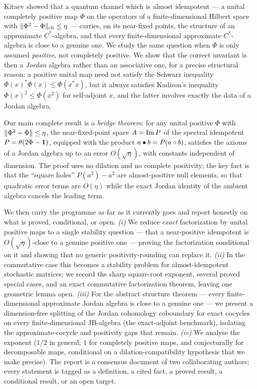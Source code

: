 Kitaev showed that a quantum channel which is almost idempotent --- a unital
completely positive map $\Phi$ on the operators of a finite-dimensional Hilbert
space with $\lVert \Phi^2-\Phi \rVert_{\mathrm{cb}}\le\eta$ --- carries, on its
near-fixed points, the structure of an approximate $C^*$-algebra, and that every
finite-dimensional approximate $C^*$-algebra is close to a genuine one. We study
the same question when $\Phi$ is only assumed \emph{positive}, not completely
positive. We show that the correct invariant is then a \emph{Jordan} algebra
rather than an associative one, for a precise structural reason: a positive
unital map need not satisfy the Schwarz inequality $\Phi(x)^*\Phi(x)\le
\Phi(x^*x)$, but it always satisfies Kadison's inequality $\Phi(x)^2\le\Phi(x^2)$
for self-adjoint $x$, and the latter involves exactly the data of a Jordan
algebra.

Our main complete result is a \emph{bridge theorem}: for any unital positive
$\Phi$ with $\lVert \Phi^2-\Phi \rVert\le\eta$, the near-fixed-point space
$A=\operatorname{Im} P$ of the spectral idempotent $P=\theta(2\Phi-\mathbf{1})$, equipped with the
product $a\bullet b=P(a\circ b)$, satisfies the axioms of a Jordan algebra up to
an error $O(\sqrt\eta)$, with constants independent of dimension. The proof uses
no dilation and no complete positivity; the key fact is that the ``square holes''
$P(a^2)-a^2$ are almost-positive null elements, so that quadratic error terms are
$O(\eta)$ while the exact Jordan identity of the ambient algebra cancels the
leading term.

We then carry the programme as far as it currently goes and report honestly on
what is proved, conditional, or open. \emph{(i)} We reduce \emph{exact}
factorization by unital positive maps to a single stability question
--- that a near-positive idempotent is $O(\sqrt\eta)$-close to a genuine positive
one --- proving the factorization conditional on it and showing that no
generic positivity-rounding can replace it. \emph{(ii)} In the commutative case
this becomes a stability problem for almost-idempotent stochastic matrices; we
record the sharp square-root exponent, several proved special cases, and an exact
commutative factorization theorem, leaving one geometric lemma open.
\emph{(iii)} For the abstract structure theorem --- every finite-dimensional
approximate Jordan algebra is close to a genuine one --- we present a
dimension-free splitting of the Jordan cohomology coboundary for exact cocycles
on every finite-dimensional JB-algebra (the exact-adjoint benchmark), isolating
the approximate-cocycle and positivity gaps that remain. \emph{(iv)} We analyse
the exponent ($1/2$ in general; $1$ for completely positive maps, and
conjecturally for decomposable maps, conditional on a dilation-compatibility
hypothesis that we make precise). The report is a consensus document of two
collaborating authors; every statement is tagged as a definition, a cited fact,
a proved result, a conditional result, or an open target.

